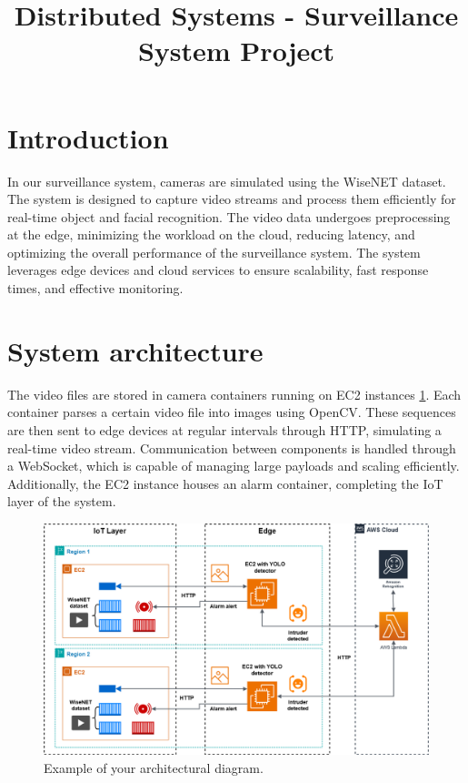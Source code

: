\documentclass[conference]{IEEEtran}
\begin{document}
\title{Distributed Systems - Surveillance System Project}

\author{
\and
{}
\and
{}
}

\maketitle

\section{Introduction}
In our surveillance system, cameras are simulated using the WiseNET dataset. The system is designed to capture video streams and process them efficiently for real-time object and facial recognition. The video data undergoes preprocessing at the edge, minimizing the workload on the cloud, reducing latency, and optimizing the overall performance of the surveillance system. The system leverages edge devices and cloud services to ensure scalability, fast response times, and effective monitoring.  

\section{System architecture}
The video files are stored in camera containers running on EC2 instances \ref{fig:architecture}. Each container parses a certain video file into images using OpenCV. These sequences are then sent to edge devices at regular intervals through HTTP, simulating a real-time video stream. Communication between components is handled through a WebSocket, which is capable of managing large payloads and scaling efficiently. Additionally, the EC2 instance houses an alarm container, completing the IoT layer of the system.

\begin{figure}[h!]
    \centering
    \includegraphics[width=1\linewidth]{res/report/DS_architecture_version2.png}
    \caption{Example of your architectural diagram.}
    \label{fig:architecture}
\end{figure}
\end{document}
